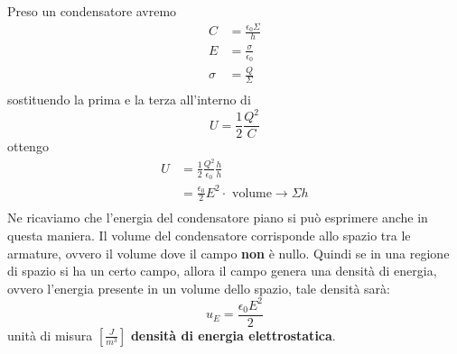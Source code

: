 \documentclass[a4paper, 12pt]{book}
\theoremstyle{plain}
\begin{document}
Preso un condensatore avremo 
\[
    \begin{split}
        C &= \frac{\epsilon_0 \Sigma}{h} \\
        E &= \frac{\sigma}{\epsilon_0} \\
        \sigma &= \frac{Q}{\Sigma} \\
    \end{split}
\]
sostituendo la prima e la terza all'interno di \[ U = \frac{1}{2} \frac{Q^2}{C} \]
ottengo 
\[
    \begin{split}
        U &= \frac{1}{2} \frac{Q^2}{\epsilon_0} \frac{h}{h} \\
        &= \frac{\epsilon_0}{2} E^2 \cdot \textrm{ volume} \rightarrow \Sigma h \\
    \end{split}    
\] 
Ne ricaviamo che l'energia del condensatore piano si può 
esprimere anche in questa maniera. Il volume del condensatore 
corrisponde allo spazio tra le armature, ovvero il volume 
dove il campo \textbf{non} è nullo. Quindi se in una regione 
di spazio si ha un certo campo, allora il campo 
genera una densità di energia, ovvero l'energia presente 
in un volume dello spazio, tale densità sarà:
\[ u_E = \frac{\epsilon_0 E^2}{2} \] 
unità di misura $[\frac{J}{m^3}]$ \textbf{densità di energia 
elettrostatica}.
\end{document}
